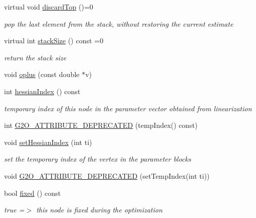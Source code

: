 \begin{DoxyCompactItemize}
virtual void \hyperlink{classg2o_1_1OptimizableGraph_1_1Vertex_a9509fb5c333988911312fc3d9187a9c3}{discard\+Top} ()=0
\begin{DoxyCompactList}\small\item\em pop the last element from the stack, without restoring the current estimate \end{DoxyCompactList}\item 
virtual int \hyperlink{classg2o_1_1OptimizableGraph_1_1Vertex_a0a4ecc894d008d9c3806a3660e7dfe6f}{stack\+Size} () const =0
\begin{DoxyCompactList}\small\item\em return the stack size \end{DoxyCompactList}\item 
void \hyperlink{classg2o_1_1OptimizableGraph_1_1Vertex_af4357b634cfd884cd2fa1abb05832ec8}{oplus} (const double $\ast$v)
\item 
int \hyperlink{classg2o_1_1OptimizableGraph_1_1Vertex_a33009d06f2d3682a3c774182c807c48a}{hessian\+Index} () const 
\begin{DoxyCompactList}\small\item\em temporary index of this node in the parameter vector obtained from linearization \end{DoxyCompactList}\item 
int \hyperlink{classg2o_1_1OptimizableGraph_1_1Vertex_a8f22181a161d724e95631d5da742b66a}{G2\+O\+\_\+\+A\+T\+T\+R\+I\+B\+U\+T\+E\+\_\+\+D\+E\+P\+R\+E\+C\+A\+T\+ED} (temp\+Index() const)
\item 
void \hyperlink{classg2o_1_1OptimizableGraph_1_1Vertex_a440f24c0108be5247f3529369aa1e53c}{set\+Hessian\+Index} (int ti)
\begin{DoxyCompactList}\small\item\em set the temporary index of the vertex in the parameter blocks \end{DoxyCompactList}\item 
void \hyperlink{classg2o_1_1OptimizableGraph_1_1Vertex_abdcd545b6870b37135b055d18dae7a36}{G2\+O\+\_\+\+A\+T\+T\+R\+I\+B\+U\+T\+E\+\_\+\+D\+E\+P\+R\+E\+C\+A\+T\+ED} (set\+Temp\+Index(int ti))
\item 
bool \hyperlink{classg2o_1_1OptimizableGraph_1_1Vertex_ac83c34e6176f0cc5315ad7401a49efb3}{fixed} () const 
\begin{DoxyCompactList}\small\item\em true =$>$ this node is fixed during the optimization \end{DoxyCompactList}\item 

\end{DoxyCompactItemize}
